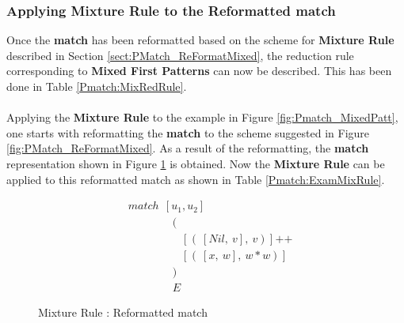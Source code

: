 \documentclass[11pt]{article}
\begin{document}
\subsubsection{Applying Mixture Rule to the Reformatted match}
Once the {\bf match} has been reformatted based on the scheme for {\bf Mixture Rule} described in Section \ref {sect:PMatch_ReFormatMixed}, the reduction rule corresponding to {\bf Mixed First Patterns} can now be described. This has been done in Table \ref {Pmatch:MixRedRule}.
~~\\~~\\
Applying the {\bf Mixture Rule} to the example in Figure \ref {fig:Pmatch_MixedPatt}, one starts with reformatting the {\bf match} to the scheme suggested in Figure \ref {fig:PMatch_ReFormatMixed}. As a result of the reformatting, the {\bf match} representation shown in Figure \ref {fig:PMatch_ReFormatExamMixed} is obtained. Now the {\bf Mixture Rule} can be applied to this reformatted match as shown in Table \ref {Pmatch:ExamMixRule}.  

\begin{figure}
\begin{align*}
&match~~[u_1,u_2] \\
&\qquad\qquad \bigg ( \\ 
&\qquad\qquad\quad \bigg[~(~[Nil,~v],~v)~\bigg]~\texttt{++}\\
&\qquad\qquad\quad \bigg[~(~[x,~w],~w*w)~\bigg]~\\
&\qquad\qquad \bigg )\\
&\qquad\qquad E
\end{align*}
\caption{Mixture Rule : Reformatted match}  \label{fig:PMatch_ReFormatExamMixed}
\end{figure}
\end{document}
